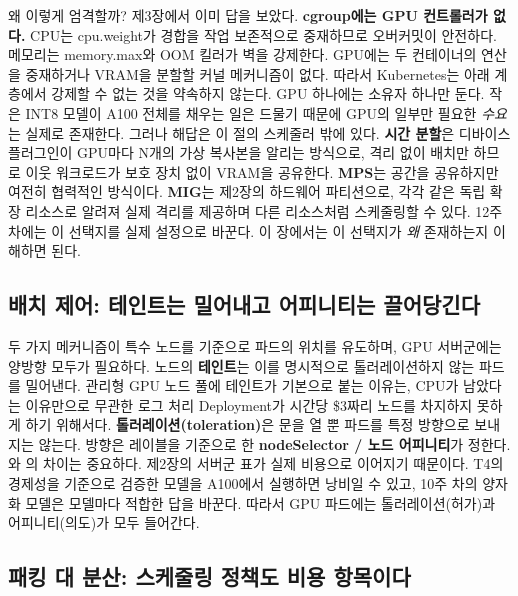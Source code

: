 왜 이렇게 엄격할까? 제3장에서 이미 답을 보았다. \textbf{cgroup에는 GPU 컨트롤러가 없다.} CPU는 cpu.weight가 경합을 작업 보존적으로 중재하므로 오버커밋이 안전하다. 메모리는 memory.max와 OOM 킬러가 벽을 강제한다. GPU에는 두 컨테이너의 연산을 중재하거나 VRAM을 분할할 커널 메커니즘이 없다. 따라서 Kubernetes는 아래 계층에서 강제할 수 없는 것을 약속하지 않는다. GPU 하나에는 소유자 하나만 둔다. 작은 INT8 모델이 A100 전체를 채우는 일은 드물기 때문에 GPU의 일부만 필요한 \textit{수요}는 실제로 존재한다. 그러나 해답은 이 절의 스케줄러 밖에 있다. \textbf{시간 분할}은 디바이스 플러그인이 GPU마다 N개의 가상 복사본을 알리는 방식으로, 격리 없이 배치만 하므로 이웃 워크로드가 보호 장치 없이 VRAM을 공유한다. \textbf{MPS}는 공간을 공유하지만 여전히 협력적인 방식이다. \textbf{MIG}는 제2장의 하드웨어 파티션으로, 각각  같은 독립 확장 리소스로 알려져 실제 격리를 제공하며 다른 리소스처럼 스케줄링할 수 있다. 12주 차에는 이 선택지를 실제 설정으로 바꾼다. 이 장에서는 이 선택지가 \textit{왜} 존재하는지 이해하면 된다.

\subsection*{배치 제어: 테인트는 밀어내고 어피니티는 끌어당긴다}

두 가지 메커니즘이 특수 노드를 기준으로 파드의 위치를 유도하며, GPU 서버군에는 양방향 모두가 필요하다. 노드의 \textbf{테인트}는 이를 명시적으로 톨러레이션하지 않는 파드를 밀어낸다. 관리형 GPU 노드 풀에  테인트가 기본으로 붙는 이유는, CPU가 남았다는 이유만으로 무관한 로그 처리 Deployment가 시간당 \$3짜리 노드를 차지하지 못하게 하기 위해서다. \textbf{톨러레이션(toleration)}은 문을 열 뿐 파드를 특정 방향으로 보내지는 않는다. 방향은 레이블을 기준으로 한 \textbf{nodeSelector / 노드 어피니티}가 정한다. 와 의 차이는 중요하다. 제2장의 서버군 표가 실제 비용으로 이어지기 때문이다. T4의 경제성을 기준으로 검증한 모델을 A100에서 실행하면 낭비일 수 있고, 10주 차의 양자화 모델은 모델마다 적합한 답을 바꾼다. 따라서 GPU 파드에는 톨러레이션(허가)과 어피니티(의도)가 모두 들어간다.

\subsection*{패킹 대 분산: 스케줄링 정책도 비용 항목이다}

